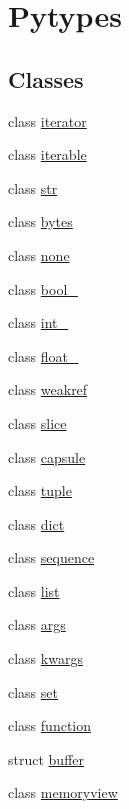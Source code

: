 \hypertarget{group__pytypes}{}\section{Pytypes}
\label{group__pytypes}
\subsection*{Classes}
\begin{DoxyCompactItemize}
\item 
class \mbox{\hyperlink{classiterator}{iterator}}
\item 
class \mbox{\hyperlink{classiterable}{iterable}}
\item 
class \mbox{\hyperlink{classstr}{str}}
\item 
class \mbox{\hyperlink{classbytes}{bytes}}
\item 
class \mbox{\hyperlink{classnone}{none}}
\item 
class \mbox{\hyperlink{classbool__}{bool\+\_\+}}
\item 
class \mbox{\hyperlink{classint__}{int\+\_\+}}
\item 
class \mbox{\hyperlink{classfloat__}{float\+\_\+}}
\item 
class \mbox{\hyperlink{classweakref}{weakref}}
\item 
class \mbox{\hyperlink{classslice}{slice}}
\item 
class \mbox{\hyperlink{classcapsule}{capsule}}
\item 
class \mbox{\hyperlink{classtuple}{tuple}}
\item 
class \mbox{\hyperlink{classdict}{dict}}
\item 
class \mbox{\hyperlink{classsequence}{sequence}}
\item 
class \mbox{\hyperlink{classlist}{list}}
\item 
class \mbox{\hyperlink{classargs}{args}}
\item 
class \mbox{\hyperlink{classkwargs}{kwargs}}
\item 
class \mbox{\hyperlink{classset}{set}}
\item 
class \mbox{\hyperlink{classfunction}{function}}
\item 
struct \mbox{\hyperlink{classbuffer}{buffer}}
\item 
class \mbox{\hyperlink{classmemoryview}{memoryview}}
\end{DoxyCompactItemize}
